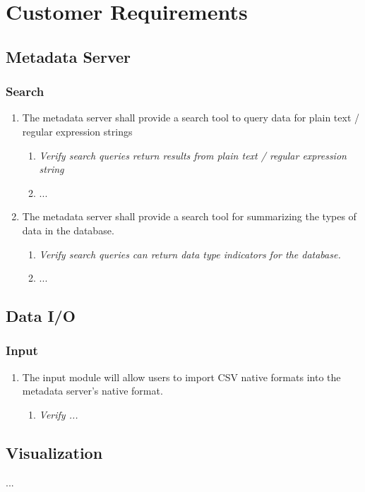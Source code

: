 \section{Customer Requirements}
\subsection{Metadata Server}
\subsubsection{Search}
	\begin{enumerate}
		\item The metadata server shall provide a search tool to query data for plain text / regular expression strings

		\begin{enumerate}
			\item \textit{Verify search queries return results from plain text / regular expression string}
			\item ...
		\end{enumerate}

		\item The metadata server shall provide a search tool for summarizing the types of data in the database.
		\begin{enumerate}
			\item \textit{Verify search queries can return data type indicators for the database.}
		\item ...
		\end{enumerate}

	\end{enumerate}

\subsection{Data I/O}
\subsubsection{Input}
	\begin{enumerate}
		\item The input module will allow users to import CSV native formats into the metadata server’s native format.

		\begin{enumerate}
			\item \textit{Verify ...}
		\end{enumerate}

	\end{enumerate}

\subsection{Visualization}
...

